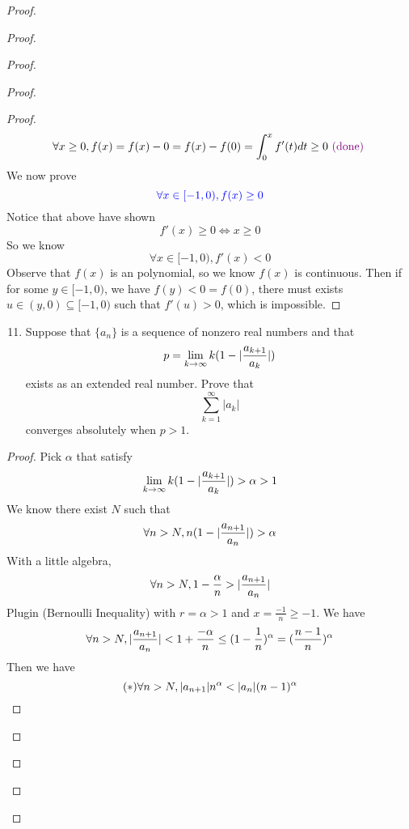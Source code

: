 \documentclass{report}
\begin{document}
\begin{proof}
\begin{proof}
\begin{proof}
\begin{proof}
\begin{proof}
\begin{equation}
\forall x\geq 0, f(x)=f(x)-0=f(x)-f(0)=\int_{0}^x f'(t)dt\geq 0\textcolor{violet}{\text{ (done) }}
\end{equation}
We now prove
\begin{equation}
\textcolor{blue}{\forall x\in [-1,0), f(x)\geq 0}
\end{equation}
Notice that above have shown
\begin{equation}
f'(x)\geq 0\iff  x\geq 0
\end{equation}
So we know
\begin{equation}
\forall x\in [-1,0), f'(x)<0
\end{equation}
Observe that $f(x)$ is an polynomial, so we know  $f(x)$ is continuous. Then if for some $y\in [-1,0)$, we have $f(y)<0=f(0)$, there must exists $u\in (y,0)\subseteq [-1,0)$ such that $f'(u)>0$, which is impossible.
\end{proof}
\begin{question}{}{}
\begin{enumerate}
    \setcounter{enumi}{10}
    \item Suppose that \( \{ a_n \} \) is a sequence of nonzero real numbers and that
    \[
    p = \lim_{{k \to \infty}} k(1-|\frac{a_{k+1}}{a_k}|)
    \]
    exists as an extended real number. Prove that
    \[
    \sum_{k=1}^{\infty} |a_k|
    \]
    converges absolutely when \( p > 1 \).
\end{enumerate}
\end{question}
\begin{proof}
Pick $\alpha $ that satisfy
\begin{equation}
\lim_{k\to\infty}k(1-|\frac{a_{k+1}}{a_k}|)>\alpha >1
\end{equation}
We know there exist $N$ such that
 \begin{equation}
\forall n>N, n(1-|\frac{a_{n+1}}{a_n}|)>\alpha 
\end{equation}
With a little algebra,
\begin{equation}
\forall n>N, 1-\frac{\alpha }{n}>|\frac{a_{n+1}}{a_n}|
\end{equation}
Plugin  (Bernoulli Inequality) with $r=\alpha >1$ and $x=\frac{-1}{n}\geq -1$. We have
\begin{equation}
\forall n>N,|\frac{a_{n+1}}{a_n}|<1+\frac{-\alpha }{n}\leq (1-\frac{1}{n})^\alpha= (\frac{n-1}{n})^{\alpha }
\end{equation}
Then we have
\begin{equation}
  (*)\forall n>N, |a_{n+1}|n^\alpha < |a_n| (n-1)^{\alpha }
\end{equation}

\end{proof}
\end{proof}
\end{proof}
\end{proof}
\end{proof}
\end{document}
